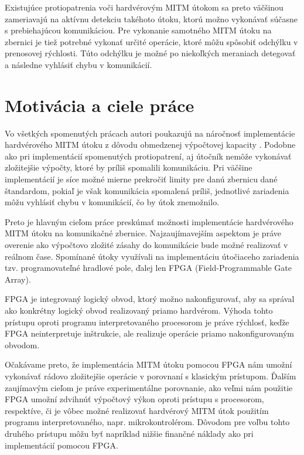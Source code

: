 Existujúce protiopatrenia voči hardvérovým MITM útokom sa preto väčšinou zameriavajú na aktívnu detekciu takéhoto útoku, ktorú možno vykonávať súčasne s prebiehajúcou komunikáciou. Pre vykonanie samotného MITM útoku na zbernici je tiež potrebné vykonať určité operácie, ktoré môžu spôsobiť odchýlku v prenosovej rýchlosti. Túto odchýlku je možné po niekoľkých meraniach detegovať a následne vyhlásiť chybu v komunikácií.

\section{Motivácia a ciele práce}
Vo všetkých spomenutých prácach autori poukazujú na náročnosť implementácie hardvérového MITM útoku z dôvodu obmedzenej výpočtovej kapacity \cite{mitmPCIe, mitmCAN, mitmTouch}. Podobne ako pri implementácií spomenutých protiopatrení, aj útočník nemôže vykonávať zložitejšie výpočty, ktoré by príliš spomalili komunikáciu. Pri väčšine implementácií je síce možné mierne prekročiť limity pre danú zbernicu dané štandardom, pokiaľ je však komunikácia spomalená príliš, jednotlivé zariadenia môžu vyhlásiť chybu v komunikácií, čo by útok znemožnilo.

Preto je hlavným cieľom práce preskúmať možnosti implementácie hardvérového MITM útoku na komunikačné zbernice. Najzaujímavejším aspektom je práve overenie ako výpočtovo zložité zásahy do komunikácie bude možné realizovať v reálnom čase. Spomínané útoky využívali na implementáciu útočiaceho zariadenia tzv. programovateľné hradlové pole, ďalej len FPGA (Field-Programmable Gate Array).

FPGA je integrovaný logický obvod, ktorý možno nakonfigurovať, aby sa správal ako konkrétny logický obvod realizovaný priamo hardvérom. Výhoda tohto prístupu oproti programu interpretovaného procesorom je práve rýchlosť, keďže FPGA neinterpretuje inštrukcie, ale realizuje operácie priamo nakonfigurovaným obvodom.

Očakávame preto, že implementácia MITM útoku pomocou FPGA nám umožní vykonávať rádovo zložitejšie operácie v porovnaní s klasickým prístupom. Ďalším zaujímavým cieľom je práve experimentálne porovnanie, ako veľmi nám použitie FPGA umožní zdvihnúť výpočtový výkon oproti prístupu s procesorom, respektíve, či je vôbec možné realizovať hardvérový MITM útok použitím programu interpretovaného, napr. mikrokontrolérom. Dôvodom pre voľbu tohto druhého prístupu môžu byť napríklad nižšie finančné náklady ako pri implementácií pomocou FPGA.

